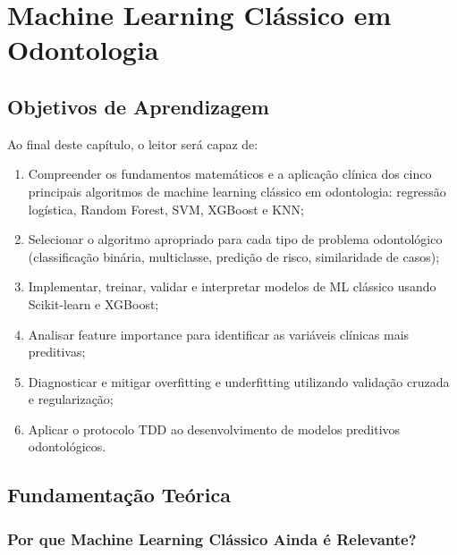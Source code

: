 
\chapter{Machine Learning Clássico em Odontologia}
\label{cap:ml-classico}

\nivelbasico

\section{Objetivos de Aprendizagem}

Ao final deste capítulo, o leitor será capaz de:
\begin{enumerate}
    \item Compreender os fundamentos matemáticos e a aplicação clínica dos cinco principais algoritmos de machine learning clássico em odontologia: regressão logística, Random Forest, SVM, XGBoost e KNN;
    \item Selecionar o algoritmo apropriado para cada tipo de problema odontológico (classificação binária, multiclasse, predição de risco, similaridade de casos);
    \item Implementar, treinar, validar e interpretar modelos de ML clássico usando Scikit-learn e XGBoost;
    \item Analisar feature importance para identificar as variáveis clínicas mais preditivas;
    \item Diagnosticar e mitigar overfitting e underfitting utilizando validação cruzada e regularização;
    \item Aplicar o protocolo TDD ao desenvolvimento de modelos preditivos odontológicos.
\end{enumerate}

\section{Fundamentação Teórica}

\subsection{Por que Machine Learning Clássico Ainda é Relevante?}


